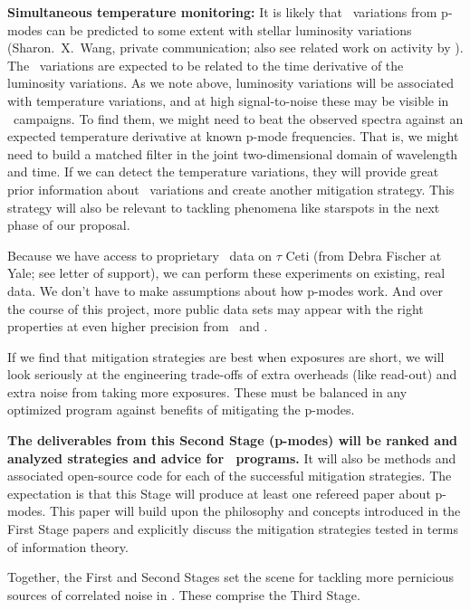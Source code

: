\documentclass[12pt, letterpaper]{article}
\begin{document}
\begin{itemize}
\textbf{Simultaneous temperature monitoring:}
It is likely that \RV\ variations from p-modes can be predicted
to some extent with stellar luminosity variations
(Sharon.~X.~Wang, private communication; also see related work on activity by \citealt{Aigrain}).
The \RV\ variations are expected to be related to the time derivative of the
luminosity variations.
As we note above, luminosity variations will be associated with
temperature variations, and at high signal-to-noise these may be
visible in \EPRV\ campaigns.
To find them, we might need to beat the observed spectra against an
expected temperature derivative at known p-mode frequencies.
That is, we might need to build a matched filter in the joint
two-dimensional domain of wavelength and time.
If we can detect the temperature variations, they will provide great
prior information about \RV\ variations and create another mitigation
strategy. 
This strategy will also be relevant to tackling phenomena like starspots in
the next phase of our proposal.
\end{itemize}

\noindent
Because we have access to proprietary \EXPRES\ data on $\tau$ Ceti 
(from Debra Fischer at Yale; see letter of support),
we can perform these experiments on existing, real data.
We don't have to make assumptions about how p-modes work.
And over the course of this project, more public data sets may appear
with the right properties at even higher precision from \ESPRESSO\ and \NEID.

If we find that mitigation strategies are best when exposures
are short, we will look seriously at the engineering trade-offs
of extra overheads (like read-out) and extra noise from taking
more exposures. These must be balanced in any optimized program
against benefits of mitigating the p-modes.

\textbf{The deliverables from this Second Stage (p-modes) will be ranked
and analyzed strategies and advice for \EPRV\ programs.} It will
also be methods and associated open-source code for each of the successful
mitigation strategies.
The expectation is that this Stage will produce at least one
refereed paper about p-modes. 
This paper will build upon the philosophy and concepts introduced in the First Stage 
papers and explicitly discuss the mitigation strategies tested in 
terms of information theory.

Together, the First and Second Stages set the scene for tackling more
pernicious sources of correlated noise in \EPRV.
These comprise the Third Stage.
\end{document}

